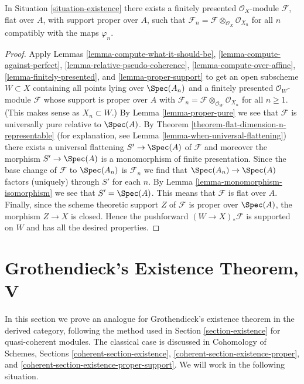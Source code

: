 \begin{theorem}
\label{theorem-existence}
In Situation \ref{situation-existence}
there exists a finitely presented $\mathcal{O}_X$-module
$\mathcal{F}$, flat over $A$, with support proper over $A$,
such that
$\mathcal{F}_n = \mathcal{F} \otimes_{\mathcal{O}_X} \mathcal{O}_{X_n}$
for all $n$ compatibly with the maps $\varphi_n$.
\end{theorem}

\begin{proof}
Apply Lemmas \ref{lemma-compute-what-it-should-be},
\ref{lemma-compute-against-perfect},
\ref{lemma-relative-pseudo-coherence},
\ref{lemma-compute-over-affine},
\ref{lemma-finitely-presented}, and
\ref{lemma-proper-support}
to get an open subscheme $W \subset X$ containing all points
lying over $\Spec(A_n)$
and a finitely presented $\mathcal{O}_W$-module $\mathcal{F}$
whose support is proper over $A$ with
$\mathcal{F}_n = \mathcal{F} \otimes_{\mathcal{O}_W} \mathcal{O}_{X_n}$
for all $n \geq 1$. (This makes sense as $X_n \subset W$.)
By Lemma \ref{lemma-proper-pure} we see that $\mathcal{F}$
is universally pure relative to $\Spec(A)$.
By Theorem \ref{theorem-flat-dimension-n-representable}
(for explanation, see Lemma \ref{lemma-when-universal-flattening})
there exists a universal flattening $S' \to \Spec(A)$
of $\mathcal{F}$ and moreover the morphism $S' \to \Spec(A)$
is a monomorphism of finite presentation.
Since the base change of $\mathcal{F}$ to $\Spec(A_n)$
is $\mathcal{F}_n$ we find that $\Spec(A_n) \to \Spec(A)$
factors (uniquely) through $S'$ for each $n$.
By Lemma \ref{lemma-monomorphism-isomorphism}
we see that $S' = \Spec(A)$.
This means that $\mathcal{F}$ is flat over $A$.
Finally, since the scheme theoretic support $Z$ of $\mathcal{F}$
is proper over $\Spec(A)$, the morphism $Z \to X$ is closed.
Hence the pushforward $(W \to X)_*\mathcal{F}$ is supported
on $W$ and has all the desired properties.
\end{proof}






\section{Grothendieck's Existence Theorem, V}
\label{section-existence-derived}

\noindent
In this section we prove an analogue for Grothendieck's existence theorem
in the derived category, following the method used in
Section \ref{section-existence} for quasi-coherent modules.
The classical case is discussed in
Cohomology of Schemes, Sections \ref{coherent-section-existence},
\ref{coherent-section-existence-proper}, and
\ref{coherent-section-existence-proper-support}.
We will work in the following situation.

